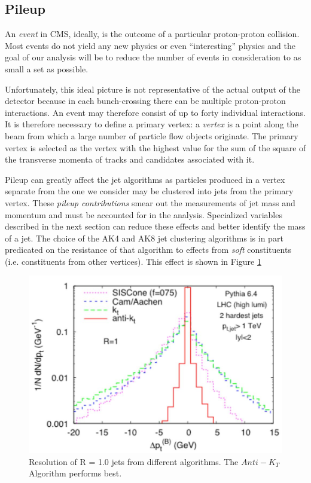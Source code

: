 \subsection{Pileup}
An \textit{event} in CMS, ideally, is the outcome of a particular proton-proton collision. Most events do not yield any new physics or even ``interesting'' physics and the goal of our analysis will be to reduce the number of events in consideration to as small a set as possible.

Unfortunately, this ideal picture is not representative of the actual output of the detector because in each bunch-crossing there can be multiple proton-proton interactions. An event may therefore consist of up to forty individual interactions. It is therefore necessary to define a primary vertex: a \textit{vertex} is a point along the beam from which a large number of particle flow objects originate. The primary vertex is selected as the vertex with the highest value for the sum of the square of the transverse momenta of tracks and candidates associated with it.

Pileup can greatly affect the jet algorithms as particles produced in a vertex separate from the one we consider may be clustered into jets from the primary vertex. These \textit{pileup contributions} smear out the measurements of jet mass and momentum and must be accounted for in the analysis. Specialized variables described in the next section can reduce these effects and better identify the mass of a jet. The choice of the AK4 and AK8 jet clustering algorithms is in part predicated on the resistance of that algorithm to effects from \textit{soft} constituents (i.e. constituents from other vertices). This effect is shown in Figure \ref{Fig:CMS:NoPU}
\begin{figure}[h!]
    \centering
        \includegraphics[width=\textwidth]{F3/NoPU}
        \caption{Resolution of R = 1.0 jets from different algorithms. The $Anti-K_T$ Algorithm performs best.}
        \label{Fig:CMS:NoPU}
\end{figure}